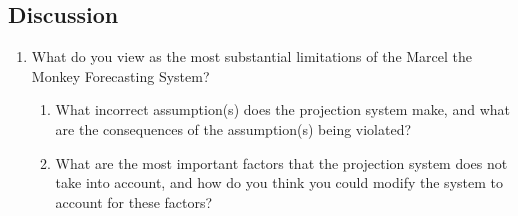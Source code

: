 \documentclass{article}
\begin{document}
  \subsection{\sc Discussion}

    \begin{enumerate}
      \item What do you view as the most substantial limitations of the Marcel the Monkey Forecasting System?
      \begin{enumerate}
        \item What incorrect assumption(s) does the projection system make, and what are the consequences of the assumption(s) being violated?
        \item What are the most important factors that the projection system does not take into account, and how do you think you could modify the system to account for these factors?
      \end{enumerate}
    \end{enumerate}
\end{document}

